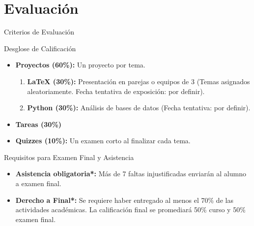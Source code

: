 \documentclass[aspectratio=169, 10pt]{beamer}
\begin{document}
\section{Evaluación}
\begin{frame}{Criterios de Evaluación}
    \begin{block}{Desglose de Calificación}
        \begin{itemize} \pause
            \item \textbf{Proyectos (60\%):} Un proyecto por tema. \pause
            \begin{enumerate} 
                \item \textbf{\LaTeX{} (30\%):} Presentación en parejas o equipos de 3 (Temas asignados aleatoriamente. Fecha tentativa de exposición: por definir). \pause
                \item \textbf{Python (30\%):} Análisis de bases de datos (Fecha tentativa: por definir). \pause
            \end{enumerate}
            \item \textbf{Tareas (30\%)} \pause
            \item \textbf{Quizzes (10\%):} Un examen corto al finalizar cada tema. \pause
        \end{itemize}
    \end{block}

    \begin{alertblock}{Requisitos para Examen Final y Asistencia}
        \begin{itemize} \justifying
            \item \textbf{Asistencia obligatoria*:} Más de 7 faltas injustificadas enviarán al alumno a examen final.
            \item \textbf{Derecho a Final*:} Se requiere haber entregado al menos el 70\% de las actividades académicas. La calificación final se promediará 50\% curso y 50\% examen final.
        \end{itemize}
    \end{alertblock}
\end{frame}
\end{document}
